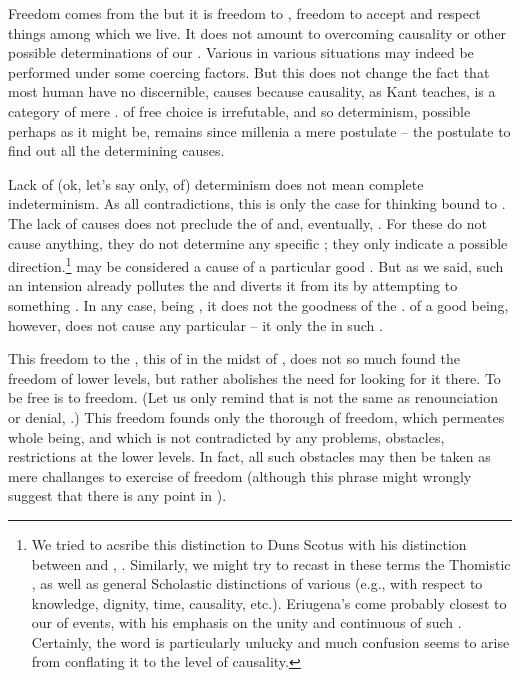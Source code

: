 \pa
Freedom comes from the  but it is freedom to
, freedom to accept and respect  things
among which we live.
%
It does not amount to overcoming causality or other possible
determinations of our . Various  in various
situations may indeed be performed under some coercing factors. But
this does not change the fact that most human  have no
discernible,  causes because causality, as Kant teaches,
is a category of mere .  of free choice
is irrefutable, and so determinism, possible perhaps as it might be,
remains since millenia a mere postulate -- the postulate to find out all
the determining causes.

Lack of (ok, let's say only,  of) determinism does not
mean complete indeterminism. As all contradictions, this is only the
case for thinking bound to . The lack of
 causes does not preclude the  of
 and, eventually, . For these do not
cause anything, they do not determine any specific ; they
only indicate  a possible direction.\footnote{We tried to
  acsribe this distinction to Duns Scotus with his distinction between  and ,
  . Similarly, we might try to recast in
  these terms the Thomistic , as well as general
  Scholastic distinctions of various  (e.g.,
  with respect to knowledge, dignity, time, causality, etc.).
  Eriugena's  come probably closest to our
   of  events, with his emphasis on
  the  unity and continuous  of such
  . Certainly, the word  is particularly unlucky
  and much confusion seems to arise from conflating it to the level of
   causality.}
%
 may be considered a
cause of a particular good .  But as we said, such an
intension already pollutes the  and diverts it from its
 by attempting to  something
. In any case, being , it does not 
the goodness of the .  of a good being, however,
does not cause any particular  -- it only  the 
 in such . 

%
This freedom to  the , this  of
 in the midst of , does not so much
found the freedom of lower levels, but rather abolishes the need for
looking for it there.  To be free is to  freedom. (Let us
only remind that  is not the same as renounciation
or denial, .) This freedom founds only the thorough
 of freedom, which permeates  whole being, and
which is not contradicted by any problems, obstacles, restrictions at
the lower levels. In fact, all such obstacles may then be taken as
mere challanges to exercise of freedom (although this phrase might
wrongly suggest that there is any point in ).

